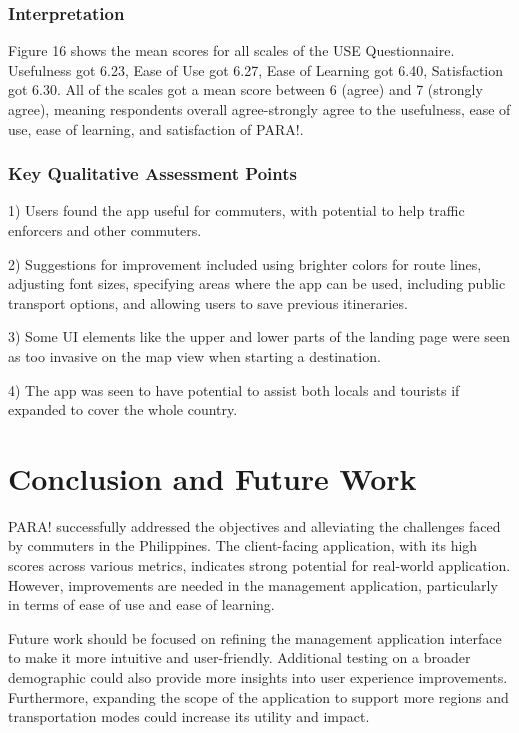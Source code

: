 \documentclass[journal]{./IEEE/IEEEtran}
\begin{document}
\subsubsection{Interpretation}
Figure 16 shows the mean scores for all scales of the USE Questionnaire. Usefulness got 6.23, Ease of Use got 6.27, Ease of Learning got 6.40, Satisfaction got 6.30.
All of the scales got a mean score between 6 (agree) and 7 (strongly agree), meaning respondents overall agree-strongly agree to the usefulness, ease of use, ease of learning, and satisfaction of PARA!.
\subsubsection{Key Qualitative Assessment Points}
\begin{description}
    \item 1) Users found the app useful for commuters, with potential to help traffic enforcers and other commuters.
    \item 2) Suggestions for improvement included using brighter colors for route lines, adjusting font sizes, specifying areas where the app can be used, including public transport options, and allowing users to save previous itineraries.
    \item 3) Some UI elements like the upper and lower parts of the landing page were seen as too invasive on the map view when starting a destination.
    \item 4) The app was seen to have potential to assist both locals and tourists if expanded to cover the whole country.
\end{description}
\section{Conclusion and Future Work}
PARA! successfully addressed the objectives and alleviating the challenges faced by commuters in the Philippines. The client-facing application, with its high scores across various metrics, indicates strong potential for real-world application. However, improvements are needed in the management application, particularly in terms of ease of use and ease of learning.

Future work should be focused on refining the management application interface to make it more intuitive and user-friendly. Additional testing on a broader demographic could also provide more insights into user experience improvements. Furthermore, expanding the scope of the application to support more regions and transportation modes could increase its utility and impact.
\end{document}
